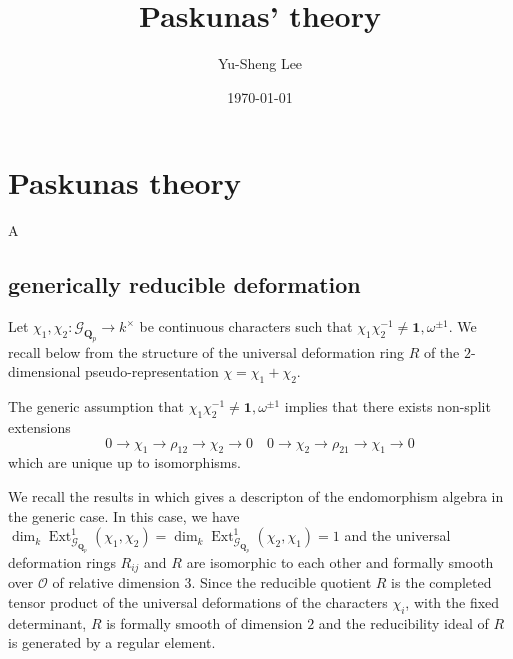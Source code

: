 \documentclass[leqno]{amsart}
\newcommand{\Gp}{\mathcal{G}_{\Qp}} %
\newcommand{\Q}{{\mathbf{Q}}}
\newcommand{\Qp}{\mathbf{Q}_p}
\newcommand{\oo}{\mathcal O}
\newcommand{\id}{\mathbf{1}}
\newcommand{\1}{\mathbf{1}}
\DeclareMathOperator{\Ext}{Ext}
\theoremstyle{definition}
\theoremstyle{remark}
\begin{document}
\title{Paskunas' theory}
\author[Y-S.~Lee]{Yu-Sheng Lee}
\address{Department of Mathematics, University  of Michigan, Ann Arbor, MI 48109, USA}
\date{\today}

\maketitle
\setcounter{tocdepth}{1}
\tableofcontents




\section{Paskunas theory}
A

\subsection{generically reducible deformation}

Let $\chi_1,\chi_2\colon \Gp\to k^\times$ be continuous characters
such that $\chi_1\chi_2^{-1}\neq \id,\omega^{\pm1}$.
We recall below from \cite[\S B.1]{pask}
the structure of the universal deformation ring $R$
of the $2$-dimensional pseudo-representation $\chi=\chi_1+\chi_2$.

The generic assumption that $\chi_1\chi_2^{-1}\neq \id,\omega^{\pm1}$
implies that there exists non-split extensions
\[
    0\to \chi_1\to \rho_{12}\to \chi_2\to 0\quad
    0\to \chi_2\to \rho_{21}\to \chi_1\to 0
\]
which are unique up to isomorphisms.


We recall the results in \cite{pask}
which gives a descripton of the endomorphism algebra in the generic case.
In this case, we have
$\dim_k\Ext_{\mathcal{G}_{\Q_p}}^1(\chi_1,\chi_2)=\dim_k\Ext_{\mathcal{G}_{\Q_p}}^1(\chi_2,\chi_1)=1$
and the universal deformation rings $R_{ij}$ and $R$ are isomorphic to each other 
and formally smooth over $\oo$ of relative dimension $3$.
Since the reducible quotient $R$ is the completed tensor product
of the universal deformations of the characters $\chi_i$, with the fixed determinant,
$R$ is formally smooth of dimension $2$
and the reducibility ideal of $R$ is generated by a regular element.
\end{document}

